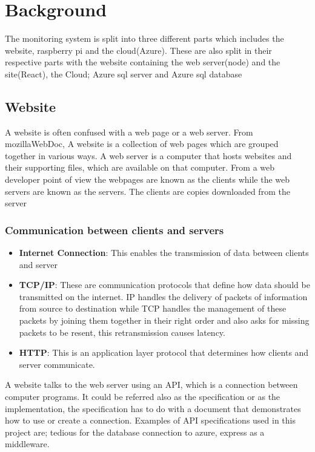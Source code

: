 
\chapter{Background}
The monitoring system is split into three different parts which includes the website, raspberry pi and the cloud(Azure). These are also split in their respective parts with the website containing the web server(node) and the site(React), the Cloud; Azure sql server and Azure sql database
 
\section{Website}
A website is often confused with a web page or a web server. From mozillaWebDoc, A website is a collection of web pages which are grouped together in various ways. A web server is a computer that hosts websites and their supporting files, which are available on that computer. From a web developer point of view the webpages are known as the clients while the web servers are known as the servers. The clients are copies downloaded from the server
 
 
\subsection{Communication between clients and servers}
\begin{itemize}
 \item \textbf{Internet Connection}: This enables the transmission of data between clients and server
 \item \textbf{TCP/IP}: These are communication protocols that define how data should be transmitted on the internet. IP handles the delivery of packets of information from source to destination while TCP handles the management of these packets by joining them together in their right order and also asks for missing packets to be resent, this retransmission causes latency.
 \item \textbf{HTTP}: This is an application layer protocol that determines how clients and server communicate.
\end{itemize}
 
A website talks to the web server using an API, which is a connection between computer programs. It could be referred also as the specification or as the implementation, the specification has to do with a document that demonstrates how to use or create a connection. Examples of API specifications used in this project are; tedious for the database connection to azure, express as a middleware.
 
